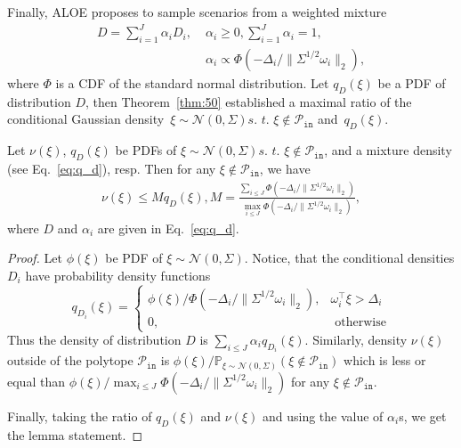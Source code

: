 Finally, ALOE proposes to sample scenarios from a weighted mixture
\begin{align}\label{eq:q_d}
  D = \sum_{i=1}^J \alpha_i D_i, \; & \alpha_i \ge 0, \sum_{i=1}^J \alpha_i = 1,\nonumber \\
  & \alpha_i \propto \Phi(-\Delta_i/\|\Sigma^{1/2}\omega_i\|_2),
\end{align}
where $\Phi$ is a CDF of the standard normal distribution. Let $q_D(\xi)$ be a PDF of distribution $D$, then Theorem~\ref{thm:50} established a maximal ratio of the conditional Gaussian density~$\xi\sim\mathcal{N}(0, \Sigma) \textit{s. t. } \xi\not\in\mathcal{P}_{\texttt{in}}$ and~$q_D(\xi)$. 

\begin{theorem}\label{thm:50}
Let $\nu(\xi)$, $q_D(\xi)$ be PDFs  of $\xi\sim\mathcal{N}(0, \Sigma) \textit{s. t. } \xi\not\in\mathcal{P}_{\texttt{in}}$, and a mixture density (see Eq.~\eqref{eq:q_d}), resp. Then for any $\xi\not\in\mathcal{P}_{\texttt{in}}$, we have
\begin{align}\label{eq:M}
  \nu(\xi) \le M q_D(\xi),  
  M = \frac{\sum_{i\le J} \Phi(-\Delta_i/\|\Sigma^{1/2}\omega_i\|_2)
  }{\max_{i\le J}\Phi(-\Delta_i/\|\Sigma^{1/2}\omega_i\|_2)}, 
\end{align}
where $D$ and $\alpha_i$ are given in Eq.~\eqref{eq:q_d}.
\end{theorem}
\begin{proof}
Let $\phi(\xi)$ be PDF of $\xi\sim\mathcal{N}(0, \Sigma)$. Notice, that the conditional densities $D_i$ have probability density functions 
\[q_{D_i}(\xi) = \begin{cases}
\phi(\xi)/\Phi(-\Delta_i/\|\Sigma^{1/2}\omega_i\|_2), & \omega_i^\top \xi > \Delta_i\\
0, & \text{ otherwise}
\end{cases}
\]
Thus the density of distribution $D$ is $\sum_{i\le J} \alpha_iq_{D_i}(\xi)$. Similarly, density $\nu(\xi)$ outside of the polytope $\mathcal{P}_{\texttt{in}}$ is $\phi(\xi)/\mathbb{P}_{\xi\sim \mathcal{N}(0, \Sigma)}(\xi\not\in \mathcal{P}_{\texttt{in}})$ which is less or equal than 
$\phi(\xi)/\max_{i\le J}\Phi(-\Delta_i/\|\Sigma^{1/2}\omega_i\|_2)$ for any $\xi \not\in \mathcal{P}_{\texttt{in}}$. 

Finally, taking the ratio of $q_D(\xi)$ and $\nu(\xi)$ and using the value of $\alpha_i$s, we get the lemma statement.
\end{proof}

